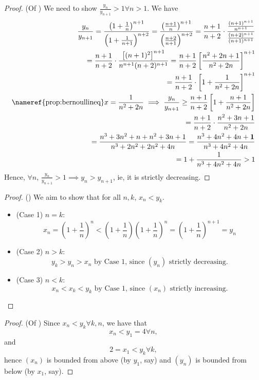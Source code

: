 \documentclass[12pt]{article}
\begin{document}
\begin{proof}(Of )
  We need to show $\frac{y_n}{y_{n+1}} > 1 \forall n > 1$. We have \begin{align*}
    \frac{y_n}{y_{n+1}} = \frac{\left(1 + \frac{1}{n}\right)^{n+1}}{\left(
1 + \frac{1}{n+1}
    \right)^{n+2}} = \frac{\left(\frac{n+1}{n}\right)^{n+1}}{\left(\frac{n+2}{n+1}\right)^{n+2}} = \frac{n+1}{n+2} \cdot \frac{\frac{(n+1)^{n+1}}{n^{n+1}}}{\frac{(n+2)^{n+1}}{(n+1)^{n+1}}}\\
    = \frac{n+1}{n+2} \cdot \frac{\left[
      (n+1)^2
    \right]^{n+1}}{n^{n+1} (n+2)^{n+1}} = \frac{n+1}{n+2} \left[
      \frac{n^2 + 2n + 1}{n^2 + 2n}
    \right]^{n+1}\\
    = \frac{n+1}{n+2} \cdot \left[1 + \frac{1}{n^2 + 2n}\right]^{n+1}\\
    \text{\nameref{prop:bernoullineq}} x = \frac{1}{n^2 + 2n} \implies \frac{y_n}{y_{n+1}}\geq \frac{n+1}{n+2} \left[
      1 + \frac{n+1}{n^2 + 2n}
    \right]\\
    = \frac{n+1}{n+2} \cdot \frac{n^2 + 3n + 1}{n^2 + 2n}\\
    = \frac{n^3 + 3n^2 + n + n^2 + 3n + 1}{n^3 + 2n^2 + 2n^2 + 4n} = \frac{n^3 + 4n^2 + 4n + \mathbf{1}}{n^3 + 4n^2 + 4n}\\
     = 1 + \frac{1}{n^3 + 4n^2 + 4n} >1
  \end{align*}
  Hence, $\forall n$, $\frac{y_n}{y_{n+1}} > 1 \implies y_n > y_{n+1}$, ie, it is strictly decreasing.
\end{proof}

\begin{proof}()
  We aim to show that for all $n,k$, $x_n < y_k$. 
  \begin{itemize}[label=-]
    \item (Case 1) $n = k$: \[
    x_n = \left(1 + \frac{1}{n}\right)^n < \left(
      1 + \frac{1}{n}
    \right)\left(
      1 + \frac{1}{n}
    \right)^n = \left(
      1 + \frac{1}{n}
    \right)^{n+1} = y_n
    \]
    \item (Case 2) $n > k$: \[
    y_k > y_n > x_n \text{ by Case 1, since $(y_n)$ strictly decreasing.}  
    \]
    \item (Case 3) $n < k$: \[
      x_{n} < x_k < y_k \text{ by Case 1, since $(x_n)$ strictly increasing.}  
    \]
  \end{itemize}
\end{proof}

\begin{proof}(Of )
  Since $x_n < y_k \forall k,n$, we have that \[x_n < y_ 1 = 4 \forall n,\] and \[
  2 = x_1 < y_k \forall k,  
  \]
  hence $(x_n)$ is bounded from above (by $y_1$, say) and $(y_n)$ is bounded from below (by $x_1$, say).
\end{proof}
\end{document}
